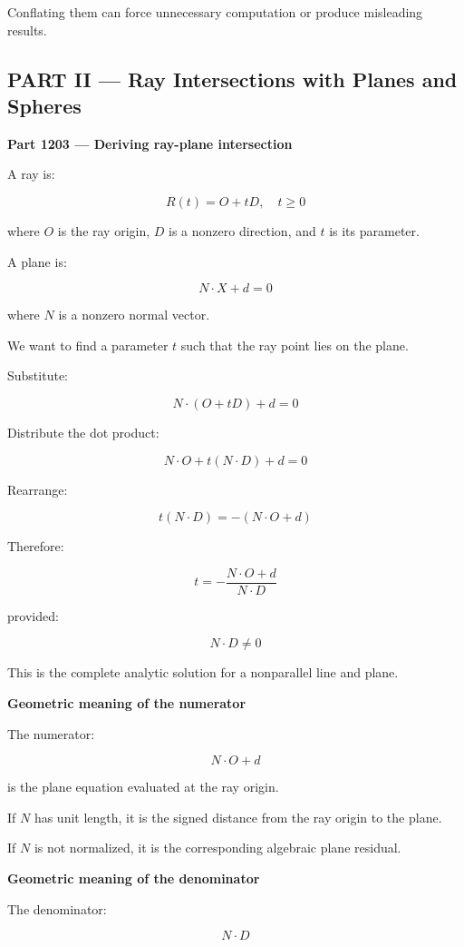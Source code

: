 Conflating them can force unnecessary computation or produce misleading results.

\subsection{PART II --- Ray Intersections with Planes and Spheres}\label{04-visual-computing-ii-ch023-part-ii-ray-intersections-with-planes-and-spheres}

\textbf{Part 1203 --- Deriving ray-plane intersection}

A ray is:

\[
\boxed{R(t)=O+tD,\quad t\ge0}
\]

where \(O\) is the ray origin, \(D\) is a nonzero direction, and \(t\) is its parameter.

A plane is:

\[
\boxed{N\cdot X+d=0}
\]

where \(N\) is a nonzero normal vector.

We want to find a parameter \(t\) such that the ray point lies on the plane.

Substitute:

\[
N\cdot(O+tD)+d=0
\]

Distribute the dot product:

\[
N\cdot O+t(N\cdot D)+d=0
\]

Rearrange:

\[
t(N\cdot D)=-(N\cdot O+d)
\]

Therefore:

\[
\boxed{ t= -\frac{N\cdot O+d}{N\cdot D} }
\]

provided:

\[
N\cdot D\ne0
\]

This is the complete analytic solution for a nonparallel line and plane.

\textbf{Geometric meaning of the numerator}

The numerator:

\[
N\cdot O+d
\]

is the plane equation evaluated at the ray origin.

If \(N\) has unit length, it is the signed distance from the ray origin to the plane.

If \(N\) is not normalized, it is the corresponding algebraic plane residual.

\textbf{Geometric meaning of the denominator}

The denominator:

\[
N\cdot D
\]

